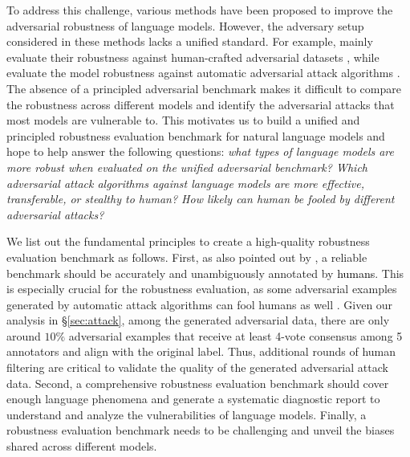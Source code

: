 \documentclass{article}
\newcommand{\m}[1]{{\textcolor{black}{{#1}}}}
\begin{document}
To address this challenge, various methods \citep{smart,freelb,wang2021infobert,alum} have been proposed to improve the adversarial robustness of language models. 
However, the adversary setup considered in these methods lacks a unified standard. 
For example, \citet{smart, alum} mainly evaluate their robustness against human-crafted adversarial datasets \citep{anli,advsquad}, while \citet{wang2021infobert}  evaluate the model robustness  against automatic adversarial attack algorithms \citep{textfooler}.  
The absence of a principled adversarial benchmark makes it difficult to compare the 
robustness across different models and identify the adversarial attacks that most models are  vulnerable to.
This motivates us to build a unified and principled robustness evaluation benchmark for natural language models and hope to help answer the following questions:\textit{ what types of language models are more robust when evaluated on the unified adversarial benchmark? Which adversarial attack algorithms against language models are more effective, transferable, or stealthy to human? How likely can human be fooled by different adversarial attacks?
}

We list out the fundamental principles to create a high-quality robustness evaluation benchmark as follows. 
First, as also pointed out by \citep{criteria}, a reliable benchmark should be accurately and unambiguously annotated by \m{humans}. 
This is especially crucial for the robustness evaluation, as some adversarial examples generated by automatic attack algorithms can fool humans as well \citep{morris-etal-2020-reevaluating}. Given our analysis in \S \ref{sec:attack}, among the generated adversarial data, there are only around $10\%$ adversarial examples that receive at least 4-vote consensus among 5 annotators and align with the original label. 
Thus, additional rounds of human filtering are critical to validate the quality of the generated adversarial attack data. 
Second, a comprehensive robustness evaluation benchmark should cover enough language phenomena and generate a systematic diagnostic report to understand and analyze the vulnerabilities of language models. 
Finally, a robustness evaluation benchmark needs to be challenging and unveil the biases shared across different models.
\end{document}
